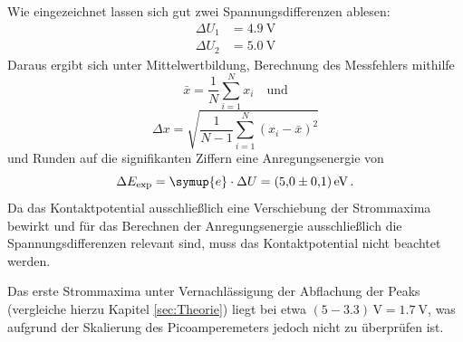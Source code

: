 Wie eingezeichnet lassen sich gut zwei Spannungsdifferenzen ablesen:
\begin{align*}
    \Delta U_1&=\SI{4.9}{\volt} \\
    \Delta U_2&=\SI{5.0}{\volt}
\end{align*}
Daraus ergibt sich unter Mittelwertbildung, Berechnung des Messfehlers mithilfe 
\begin{equation*}
    \bar{x}=\frac{1}{N}\sum_{i=1}^N x_i \quad \text{und}
\end{equation*}
\begin{equation*}
    \Delta x = \sqrt{\frac{1}{N-1} \sum_{i=1}^N (x_i-\bar{x})^2}
\end{equation*}
und Runden auf die signifikanten Ziffern eine Anregungsenergie von 
\begin{equation}
    \Delta E_\text{exp}=\symup{e}\cdot \Delta U = \SI{5.0+-0.1}{\electronvolt}\,.
\end{equation}
Da das Kontaktpotential ausschließlich eine Verschiebung der Strommaxima bewirkt und für das Berechnen der 
Anregungsenergie ausschließlich die Spannungsdifferenzen relevant sind, muss das Kontaktpotential nicht beachtet werden. 

Das erste Strommaxima unter Vernachlässigung der Abflachung der Peaks (vergleiche hierzu Kapitel \ref{sec:Theorie}) liegt bei etwa $(5-3.3)\,\si{\volt}=\SI{1.7}{\volt}$, was 
aufgrund der Skalierung des Picoamperemeters jedoch nicht zu überprüfen ist. 
